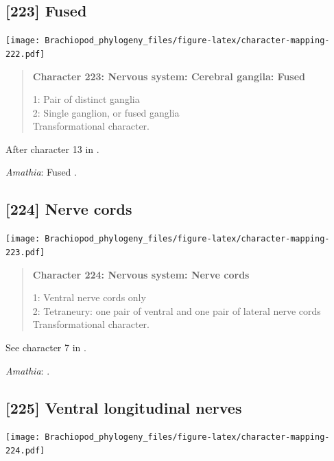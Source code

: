 \documentclass[openany]{book}
\begin{document}
\subsection*{{[}223{]} Fused}\label{fused}

\texttt{[image: Brachiopod\_phylogeny\_files/figure-latex/character-mapping-222.pdf]}

\begin{quote}
\textbf{Character 223: Nervous system: Cerebral gangila: Fused}

1: Pair of distinct ganglia\\
2: Single ganglion, or fused ganglia\\
Transformational character.
\end{quote}

After character 13 in \citet{Haszprunar1996}.

\hypertarget{Amathia-coding-223}{}
\emph{Amathia}: Fused \citep{Temereva2016Thenervous}.

\subsection*{{[}224{]} Nerve cords}\label{nerve-cords}

\texttt{[image: Brachiopod\_phylogeny\_files/figure-latex/character-mapping-223.pdf]}

\begin{quote}
\textbf{Character 224: Nervous system: Nerve cords}

1: Ventral nerve cords only\\
2: Tetraneury: one pair of ventral and one pair of lateral nerve cords\\
Transformational character.
\end{quote}

See character 7 in \citet{Haszprunar2008}.

\hypertarget{Amathia-coding-224}{}
\emph{Amathia}: \citet{Temereva2016Thenervous}.

\subsection*{{[}225{]} Ventral longitudinal
nerves}\label{ventral-longitudinal-nerves}

\texttt{[image: Brachiopod\_phylogeny\_files/figure-latex/character-mapping-224.pdf]}
\end{document}
